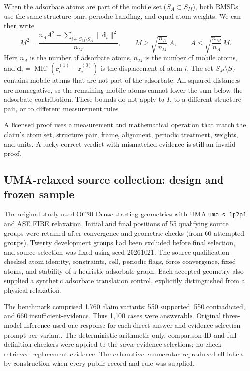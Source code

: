 \documentclass[11pt]{article}
\begin{document}
When the adsorbate atoms are part of the mobile set ($S_A\subset S_M$), both RMSDs use the same structure pair, periodic handling, and equal atom weights. We can then write
\begin{equation}
 M^2=\frac{n_A A^2+\sum_{i\in S_M\setminus S_A}\|\mathbf d_i\|^2}{n_M},
 \qquad
 M\geq\sqrt{\frac{n_A}{n_M}}\,A,
 \qquad
 A\leq\sqrt{\frac{n_M}{n_A}}\,M.
 \label{eq:si_bounds}
\end{equation}
Here $n_A$ is the number of adsorbate atoms, $n_M$ is the number of mobile atoms, and $\mathbf d_i=\operatorname{MIC}(\mathbf r_i^{(1)}-\mathbf r_i^{(0)})$ is the displacement of atom $i$. The set $S_M\setminus S_A$ contains mobile atoms that are not part of the adsorbate. All squared distances are nonnegative, so the remaining mobile atoms cannot lower the sum below the adsorbate contribution. These bounds do not apply to $I$, to a different structure pair, or to different measurement rules.

A licensed proof uses a measurement and mathematical operation that match the claim's atom set, structure pair, frame, alignment, periodic treatment, weights, and units. A lucky correct verdict with mismatched evidence is still an invalid proof.

\subsection{UMA-relaxed source collection: design and frozen sample}
The original study used OC20-Dense starting geometries with UMA \texttt{uma-s-1p2p1} and ASE FIRE relaxation. Initial and final positions of 55 qualifying source groups were retained after convergence and geometric checks (from 60 attempted groups). Twenty development groups had been excluded before final selection, and source selection was fixed using seed 20261021. The source qualification checked atom identity, constraints, cell, periodic flags, force convergence, fixed atoms, and stability of a heuristic adsorbate graph. Each accepted geometry also supplied a synthetic adsorbate translation control, explicitly distinguished from a physical relaxation.\cite{chanussot2021open,wood2025uma,larsen2017atomic}

The benchmark comprised 1,760 claim variants: 550 supported, 550 contradicted, and 660 insufficient-evidence. Thus 1,100 cases were answerable. Original three-model inference used one response for each direct-answer and evidence-selection prompt per variant. The deterministic arithmetic-only, comparison-ID and full-definition checkers were applied to the \emph{same} evidence selections; no check retrieved replacement evidence. The exhaustive enumerator reproduced all labels by construction when every public record and rule was supplied.
\end{document}
